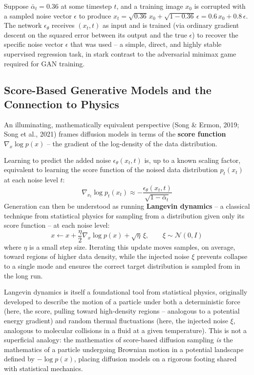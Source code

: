 \documentclass[12pt,a4paper]{article}
\begin{document}
\begin{example}
Suppose $\bar\alpha_t = 0.36$ at some timestep $t$, and a training image $x_0$ is corrupted with a sampled noise vector $\epsilon$ to produce $x_t = \sqrt{0.36}\, x_0 + \sqrt{1-0.36}\,\epsilon = 0.6\, x_0 + 0.8\,\epsilon$. The network $\epsilon_\theta$ receives $(x_t, t)$ as input and is trained (via ordinary gradient descent on the squared error between its output and the true $\epsilon$) to recover the specific noise vector $\epsilon$ that was used -- a simple, direct, and highly stable supervised regression task, in stark contrast to the adversarial minimax game required for GAN training.
\end{example}

\subsection{Score-Based Generative Models and the Connection to Physics}

An illuminating, mathematically equivalent perspective (Song \& Ermon, 2019; Song et al., 2021) frames diffusion models in terms of the \textbf{score function} $\nabla_x \log p(x)$ -- the gradient of the log-density of the data distribution.

\begin{defbox}
Learning to predict the added noise $\epsilon_\theta(x_t,t)$ is, up to a known scaling factor, equivalent to learning the score function of the noised data distribution $p_t(x_t)$ at each noise level $t$:
\[
\nabla_{x_t} \log p_t(x_t) \approx -\frac{\epsilon_\theta(x_t,t)}{\sqrt{1-\bar\alpha_t}}
\]
Generation can then be understood as running \textbf{Langevin dynamics} -- a classical technique from statistical physics for sampling from a distribution given only its score function -- at each noise level:
\[
x \leftarrow x + \frac{\eta}{2}\nabla_x \log p(x) + \sqrt{\eta}\,\xi, \qquad \xi \sim \mathcal{N}(0,I)
\]
where $\eta$ is a small step size. Iterating this update moves samples, on average, toward regions of higher data density, while the injected noise $\xi$ prevents collapse to a single mode and ensures the correct target distribution is sampled from in the long run.
\end{defbox}

\begin{keyidea}
Langevin dynamics is itself a foundational tool from statistical physics, originally developed to describe the motion of a particle under both a deterministic force (here, the score, pulling toward high-density regions -- analogous to a potential energy gradient) and random thermal fluctuations (here, the injected noise $\xi$, analogous to molecular collisions in a fluid at a given temperature). This is not a superficial analogy: the mathematics of score-based diffusion sampling \emph{is} the mathematics of a particle undergoing Brownian motion in a potential landscape defined by $-\log p(x)$, placing diffusion models on a rigorous footing shared with statistical mechanics.
\end{keyidea}
\end{document}
